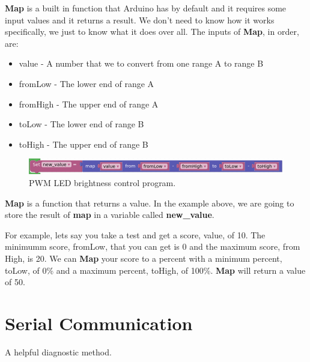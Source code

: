 \documentclass[12pt]{article}
\begin{document}
	\textbf{Map} is a built in function that Arduino has by default and it requires some input values and it returns a result. We don't need to know how it works specifically, we just to know what it does over all. The inputs of \textbf{Map}, in order, are:
	
	
	
	\begin{itemize}
		\itemsep -1em
		\item value - A number that we to convert from one range A to range B
		\item fromLow - The lower end of range A
		\item fromHigh - The upper end of range A
		\item toLow - The lower end of range B
		\item toHigh - The upper end of range B
	\end{itemize}

	\begin{figure}[H]
	\begin{center}
		\includegraphics[scale=0.5]{MAP_parameters}
		\caption{PWM LED brightness control program.}
		\label{fn:MAP_parameters}
	\end{center}
	\end{figure}

	\textbf{Map} is a function that returns a value. In the example above, we are going to store the result of \textbf{map} in a variable called \textbf{new\_value}.
	
	For example, lets say you take a test and get a score, value, of 10. The minimumm score, fromLow, that you can get is 0 and the maximum score, from High, is 20. We can \textbf{Map} your score to a percent with a minimum percent, toLow, of 0\% and a maximum percent, toHigh, of 100\%. \textbf{Map} will return a value of 50.
	
	
	
	\section{Serial Communication}
	
	A helpful diagnostic method.
	
	
	
	
	
	
\end{document}
